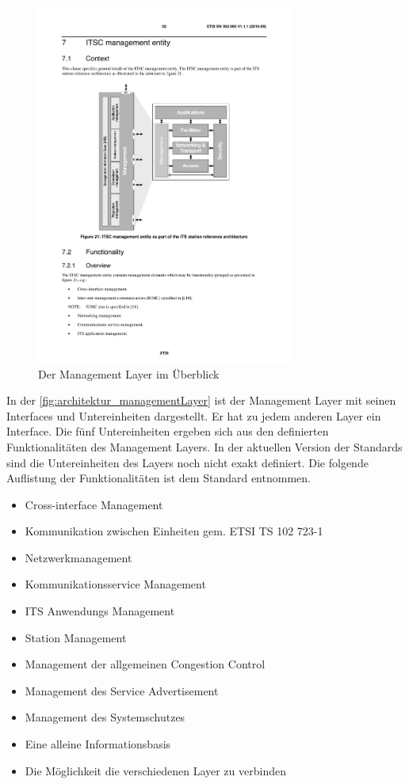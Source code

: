 \begin{figure}
	\includegraphics[width=0.75\textwidth]{content/images/02_architektur/managementLayer.pdf}
	\caption{Der Management Layer im Überblick \cite{en302665}}
	\label{fig:architektur_managementLayer}
\end{figure}

In der  \autoref{fig:architektur_managementLayer} ist der Management Layer mit seinen Interfaces und Untereinheiten dargestellt. Er hat zu jedem anderen Layer ein Interface. Die fünf Untereinheiten ergeben sich aus den definierten Funktionalitäten des Management Layers. In der aktuellen Version der Standards sind die Untereinheiten des Layers noch nicht exakt definiert. Die folgende Auflistung der Funktionalitäten ist dem Standard \cite{en302665} entnommen.

\begin{itemize}
	\item Cross-interface Management
	\item Kommunikation zwischen Einheiten gem. ETSI TS 102 723-1
	\item Netzwerkmanagement
	\item Kommunikationsservice Management
	\item \ac{ITS} Anwendungs Management
	\item Station Management
	\item Management der allgemeinen Congestion Control
	\item Management des Service Advertisement
	\item Management des Systemschutzes 
	\item Eine alleine Informationsbasis
	\item Die Möglichkeit die verschiedenen Layer zu verbinden
\end{itemize}

